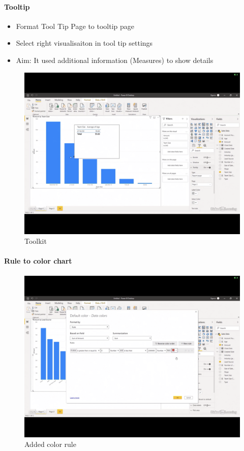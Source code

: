 \paragraph{Tooltip}
\begin{itemize}
	\item Format Tool Tip Page to tooltip page
	\item Select right visualisaiton in tool tip settings
	\item Aim: It used additional information (Measures) to show details
\end{itemize}
\begin{figure}[H]
	\centering
	\includegraphics[scale = 0.3]{attachment/chapter_1/Scc163}
	\caption{Toolkit}
\end{figure}

\paragraph{Rule to color chart}
\begin{figure}[H]
	\centering
	\includegraphics[scale = 0.3]{attachment/chapter_1/Scc164}
	\caption{Added color rule}
\end{figure}

